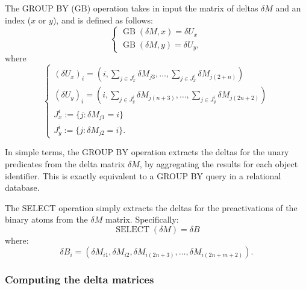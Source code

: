 \begin{definition}[GROUP BY]
	The GROUP BY ($\text{GB}$) operation takes in input the matrix of deltas $\delta M$ and an index ($x$ or $y$), and is defined as follows:
	\begin{equation*}
	\begin{cases}
	\operatorname{GB}(\delta M, x)= \delta U_x\\
	\operatorname{GB}(\delta M, y)= \delta U_y,
	\end{cases}
	\end{equation*}	
	where 	
	\begin{equation*}
	\begin{cases}
	\left(\delta U_x \right)_i = \left(i, \sum_{j\in J^i_x}\delta M_{j3},\dots, \sum_{j \in J^i_x}\delta M_{j(2+n)}\right)\\
	\left(\delta U_y \right)_i = \left(i, \sum_{j\in J^i_y}\delta M_{j(n+3)},\dots, \sum_{j \in J^i_y}\delta M_{j(2n+2)}\right)\\
	J^i_x:=\{j:\delta M_{j1}=i\}\\
	J^i_y:=\{j:\delta M_{j2}=i\}.
	\end{cases}
	\end{equation*}
\end{definition}
In simple terms, the GROUP BY operation extracts the deltas for the unary predicates from the delta matrix $\delta M$, by aggregating the results for each object identifier. This is exactly equivalent to a GROUP BY query in a relational database.

\begin{definition}[SELECT]
The SELECT operation simply extracts the deltas for the preactivations of the binary atoms from the $\delta M$ matrix. Specifically:
$$\operatorname{SELECT}(\delta M) = \delta B $$
where:
$$\delta B_i = \left(\delta M_{i1}, \delta M_{i2}, \delta M_{i(2n+3)},\dots, \delta M_{i(2n+m+2)}\right).$$
\end{definition}

\subsubsection{Computing the delta matrices} 

